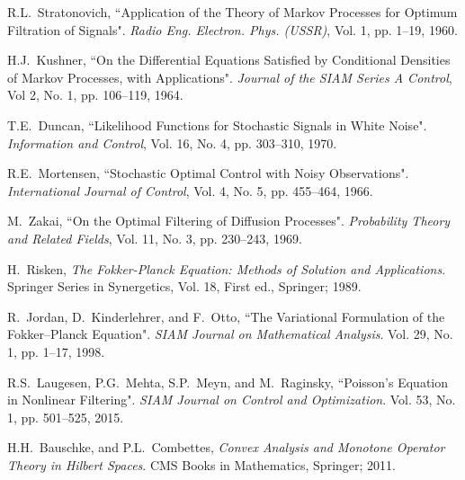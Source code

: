 \documentclass[letterpaper,10pt,twocolumn,conference]{ieeeconf}
\begin{document}


\begin{thebibliography}{99}%

R.L.~Stratonovich, ``Application of the Theory of Markov Processes for Optimum Filtration of Signals". \emph{Radio Eng. Electron. Phys. (USSR)}, Vol. 1, pp. 1--19, 1960.

H.J.~Kushner, ``On the Differential Equations Satisfied by Conditional Densities of Markov Processes, with Applications". \emph{Journal of the SIAM Series A Control}, Vol 2, No. 1, pp. 106--119, 1964.

T.E.~Duncan, ``Likelihood Functions for Stochastic Signals in White Noise". \emph{Information and Control}, Vol. 16, No. 4, pp. 303--310, 1970.


R.E.~Mortensen, ``Stochastic Optimal Control with Noisy Observations". \emph{International Journal of Control}, Vol. 4, No. 5, pp. 455--464, 1966.

M.~Zakai, ``On the Optimal Filtering of Diffusion Processes". \emph{Probability Theory and Related Fields}, Vol. 11, No. 3, pp. 230--243, 1969.




H.~Risken, \emph{The Fokker-Planck Equation: Methods of Solution and Applications}. Springer Series in Synergetics, Vol. 18, First ed., Springer; 1989.



R.~Jordan, D.~Kinderlehrer, and F.~Otto, ``The Variational Formulation of the Fokker--Planck Equation". \emph{SIAM Journal on Mathematical Analysis}. Vol. 29, No. 1, pp. 1--17, 1998.


R.S.~Laugesen, P.G.~Mehta, S.P.~Meyn, and M.~Raginsky, ``Poisson's Equation in Nonlinear Filtering". \emph{SIAM Journal on Control and Optimization}. Vol. 53, No. 1, pp. 501--525, 2015.



H.H.~Bauschke, and P.L.~Combettes, \emph{Convex Analysis and Monotone Operator Theory in Hilbert Spaces}. CMS Books in Mathematics, Springer; 2011.


\end{thebibliography}
\end{document}
